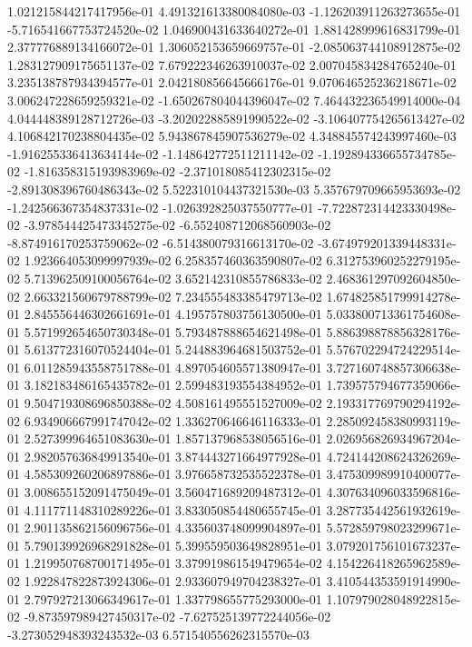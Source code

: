 1.021215844217417956e-01
4.491321613380084080e-03
-1.126203911263273655e-01
-5.716541667753724520e-02
1.046900431633640272e-01
1.881428999616831799e-01
2.377776889134166072e-01
1.306052153659669757e-01
-2.085063744108912875e-02
1.283127909175651137e-02
7.679222346263910037e-02
2.007045834284765240e-01
3.235138787934394577e-01
2.042180856645666176e-01
9.070646525236218671e-02
3.006247228659259321e-02
-1.650267804044396047e-02
7.464432236549914000e-04
4.044448389128712726e-03
-3.202022885891990522e-02
-3.106407754265613427e-02
4.106842170238804435e-02
5.943867845907536279e-02
4.348845574243997460e-03
-1.916255336413634144e-02
-1.148642772511211142e-02
-1.192894336655734785e-02
-1.816358315193983969e-02
-2.371018085412302315e-02
-2.891308396760486343e-02
5.522310104437321530e-03
5.357679709665953693e-02
-1.242566367354837331e-02
-1.026392825037550777e-01
-7.722872314423330498e-02
-3.978544425473345275e-02
-6.552408712068560903e-02
-8.874916170253759062e-02
-6.514380079316613170e-02
-3.674979201339448331e-02
1.923664053099997939e-02
6.258357460363590807e-02
6.312753960252279195e-02
5.713962509100056764e-02
3.652142310855786833e-02
2.468361297092604850e-02
2.663321560679788799e-02
7.234555483385479713e-02
1.674825851799914278e-01
2.845556446302661691e-01
4.195757803756130500e-01
5.033800713361754608e-01
5.571992654650730348e-01
5.793487888654621498e-01
5.886398878856328176e-01
5.613772316070524404e-01
5.244883964681503752e-01
5.576702294724229514e-01
6.011285943558751788e-01
4.897054605571380947e-01
3.727160748857306638e-01
3.182183486165435782e-01
2.599483193554384952e-01
1.739575794677359066e-01
9.504719308696850388e-02
4.508161495551527009e-02
2.193317769790294192e-02
6.934906667991747042e-02
1.336270646646116333e-01
2.285092458380993119e-01
2.527399964651083630e-01
1.857137968538056516e-01
2.026956826934967204e-01
2.982057636849913540e-01
3.874443271664977928e-01
4.724144208624326269e-01
4.585309260206897886e-01
3.976658732535522378e-01
3.475309989910400077e-01
3.008655152091475049e-01
3.560471689209487312e-01
4.307634096033596816e-01
4.111771148310289226e-01
3.833050854480655745e-01
3.287735442561932619e-01
2.901135862156096756e-01
4.335603748099904897e-01
5.572859798023299671e-01
5.790139926968291828e-01
5.399559503649828951e-01
3.079201756101673237e-01
1.219950768700171495e-01
3.379919861549479654e-02
4.154226418265962589e-02
1.922847822873924306e-01
2.933607949704238327e-01
3.410544353591914990e-01
2.797927213066349617e-01
1.337798655775293000e-01
1.107979028048922815e-02
-9.873597989427450317e-02
-7.627525139772244056e-02
-3.273052948393243532e-03
6.571540556262315570e-03
